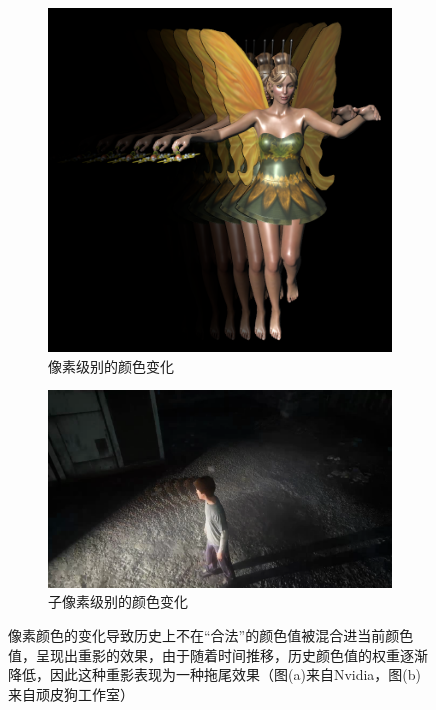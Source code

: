 \begin{figure}
\begin{fullwidth}
	\begin{subfigure}[b]{0.36\thewidth}
		\includegraphics[width=1.\textwidth]{figures/shade/ghosting-1}
		\caption{像素级别的颜色变化}
	\end{subfigure}
	\begin{subfigure}[b]{0.628\thewidth}
		\includegraphics[width=1.\textwidth]{figures/shade/ghosting-2}
		\caption{子像素级别的颜色变化}
	\end{subfigure}
	\caption{像素颜色的变化导致历史上不在“合法”的颜色值被混合进当前颜色值，呈现出重影的效果，由于随着时间推移，历史颜色值的权重逐渐降低，因此这种重影表现为一种拖尾效果（图(a)来自Nvidia，图(b)来自顽皮狗工作室）}
	\label{f:shade-ghosting}
\end{fullwidth}
\end{figure}

